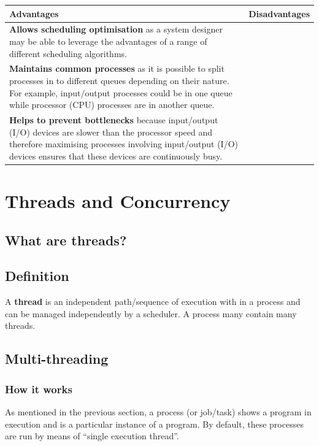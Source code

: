 \documentclass[a4paper]{systems-software}
\begin{document}
\begin{longtabu} to \textwidth {|X[1,l]|X[1,l]|}
    \hline
    \textbf{Advantages} & \textbf{Disadvantages}
    \\ \hline
    \textbf{Allows scheduling optimisation} as a system designer may be able to leverage the advantages of a range of different scheduling algorithms.
    &
    \\ \hline
  	\textbf{Maintains common processes} as it is possible to split processes in to different queues depending on their nature. For example, input/output processes could be in one queue while processor (CPU) processes are in another queue.
    &
    \\ \hline
    \textbf{Helps to prevent bottlenecks} because input/output (I/O) devices are slower than the processor speed and therefore maximising processes involving input/output (I/O) devices ensures that these devices are continuously busy.
    &
	\\ \hline
\end{longtabu}


\chapter{Threads and Concurrency}

\section{What are threads?}

\section*{Definition}

A \textbf{thread} is an independent path/sequence of execution with in a process and can be managed independently by a scheduler. A process many contain many threads.


\section*{Multi-threading}

\subsection*{How it works}

As mentioned in the previous section, a process (or job/task) shows a program in execution and is a particular instance of a program. By default, these processes are run by means of “single execution thread”.
\end{document}
